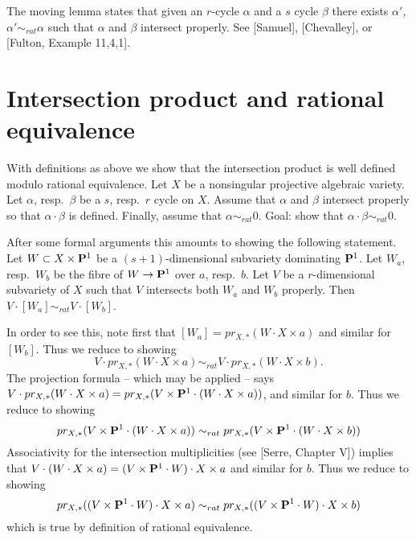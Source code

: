\noindent
The moving lemma states that given an $r$-cycle
$\alpha$ and a $s$ cycle $\beta$ there exists $\alpha'$, $\alpha' \sim_{rat}
\alpha$ such that $\alpha$ and $\beta$ intersect properly.
See [Samuel], [Chevalley], or [Fulton, Example 11,4,1].



\section{Intersection product and rational equivalence}
\label{section-intersection-product-rational-equivalence}

\noindent
With definitions as above we show that
the intersection product is well defined modulo rational
equivalence. Let $X$ be a nonsingular projective algebraic
variety. Let $\alpha$, resp.\ $\beta$ be a $s$, resp.\ $r$
cycle on $X$. Assume that $\alpha$ and $\beta$ intersect
properly so that $\alpha \cdot \beta$ is defined. Finally,
assume that $\alpha \sim_{rat} 0$. Goal: show that
$\alpha \cdot \beta \sim_{rat} 0$.

\medskip\noindent
After some formal arguments this amounts to showing the
following statement. Let $W \subset X \times {\bf P}^1$
be a $(s+1)$-dimensional subvariety dominating ${\bf P}^1$.
Let $W_a$, resp.\ $W_b$ be the fibre of $W \to {\bf P}^1$
over $a$, resp.\ $b$. Let $V$ be a $r$-dimensional
subvariety of $X$ such that $V$ intersects both $W_a$ and
$W_b$ properly. Then $V \cdot [W_a] \sim_{rat} V \cdot [W_b]$.

\medskip\noindent
In order to see this, note first that
$[W_a] = pr_{X,*}( W \cdot X\times a)$ and similar for $[W_b]$.
Thus we reduce to showing
$$
V \cdot pr_{X,*}( W \cdot X\times a) \sim_{rat} V \cdot 
pr_{X,*}( W \cdot X\times b).
$$
The projection formula -- which may be applied -- says
$V \cdot pr_{X,*}( W \cdot X\times a) =
pr_{X,*}(V \times {\bf P}^1 \cdot (W \cdot X\times a))$,
and similar for $b$. Thus we reduce to showing
$$
pr_{X,*}(V \times {\bf P}^1 \cdot (W \cdot X\times a))
\sim_{rat} 
pr_{X,*}(V \times {\bf P}^1 \cdot (W \cdot X\times b))
$$
Associativity for the intersection multiplicities (see [Serre,
Chapter V]) implies that $V \cdot (W \cdot X\times a) =
(V \times {\bf P}^1 \cdot W) \cdot X \times a$
and similar for $b$.  Thus we reduce to showing
$$
pr_{X,*}((V \times {\bf P}^1 \cdot W) \cdot X\times a)
\sim_{rat} 
pr_{X,*}((V \times {\bf P}^1 \cdot W) \cdot X\times b)
$$
which is true by definition of rational equivalence.

